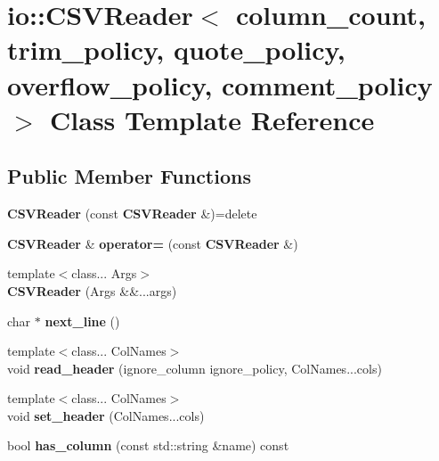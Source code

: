 \section{io\+:\+:C\+S\+V\+Reader$<$ column\+\_\+count, trim\+\_\+policy, quote\+\_\+policy, overflow\+\_\+policy, comment\+\_\+policy $>$ Class Template Reference}
\label{classio_1_1_c_s_v_reader}
\subsection*{Public Member Functions}
\begin{DoxyCompactItemize}
\item 
{\bfseries C\+S\+V\+Reader} (const {\bf C\+S\+V\+Reader} \&)=delete\label{classio_1_1_c_s_v_reader_a0507ac5abe201969a15df76795e13c28}

\item 
{\bf C\+S\+V\+Reader} \& {\bfseries operator=} (const {\bf C\+S\+V\+Reader} \&)\label{classio_1_1_c_s_v_reader_a37046e6629cf4254037c14440f14141d}

\item 
{\footnotesize template$<$class... Args$>$ }\\{\bfseries C\+S\+V\+Reader} (Args \&\&...args)\label{classio_1_1_c_s_v_reader_a189debf95672e7cd7582e9f73d7203e5}

\item 
char $\ast$ {\bfseries next\+\_\+line} ()\label{classio_1_1_c_s_v_reader_a9fec7797cb27f64360cc48adc5f32c72}

\item 
{\footnotesize template$<$class... Col\+Names$>$ }\\void {\bfseries read\+\_\+header} (ignore\+\_\+column ignore\+\_\+policy, Col\+Names...\+cols)\label{classio_1_1_c_s_v_reader_a9fad9ae02aa243dba6bc78156c5ce7e5}

\item 
{\footnotesize template$<$class... Col\+Names$>$ }\\void {\bfseries set\+\_\+header} (Col\+Names...\+cols)\label{classio_1_1_c_s_v_reader_ab68eedff1bd59a49fa4ddb160dff94e0}

\item 
bool {\bfseries has\+\_\+column} (const std\+::string \&name) const \label{classio_1_1_c_s_v_reader_a67c1d0d621fc0e4b8021d805dae9c176}


\end{DoxyCompactItemize}
